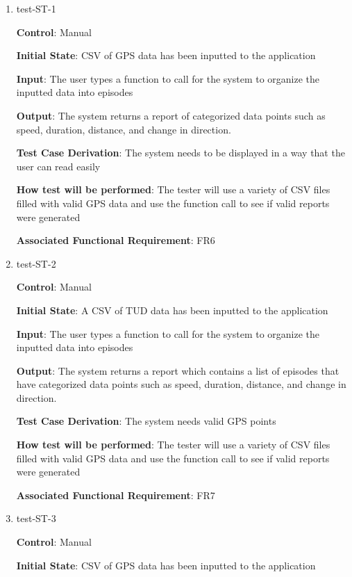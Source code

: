 \documentclass[12pt, titlepage]{article}
\begin{document}
\begin{enumerate}

\item{test-ST-1\\}

\textbf{Control}: Manual       
					
\textbf{Initial State}: CSV of GPS data has been inputted to the application
					
\textbf{Input}: The user types a function to call for the system to organize the inputted data into episodes 
					
\textbf{Output}: The system returns a report of categorized data points such as speed, duration, distance, and change in direction.

\textbf{Test Case Derivation}: The system needs to be displayed in a way that the user can read easily

\textbf{How test will be performed}: The tester will use a variety of CSV files filled with valid GPS data and use the function call to see if valid reports were generated


\textbf{Associated Functional Requirement}: FR6



\item{test-ST-2\\}

\textbf{Control}: Manual
					
\textbf{Initial State}: A CSV of TUD data has been inputted to the application
					
\textbf{Input}: The user types a function to call for the system to organize the inputted data into episodes 
					
\textbf{Output}: The system returns a report which contains a list of episodes that have categorized data points such as speed, duration, distance, and change in direction.

\textbf{Test Case Derivation}: The system needs valid GPS points

\textbf{How test will be performed}: The tester will use a variety of CSV files filled with valid GPS data and use the function call to see if valid reports were generated


\textbf{Associated Functional Requirement}: FR7

\item{test-ST-3\\}

\textbf{Control}: Manual
					
\textbf{Initial State}: CSV of GPS data has been inputted to the application
					

\end{enumerate}
\end{document}
